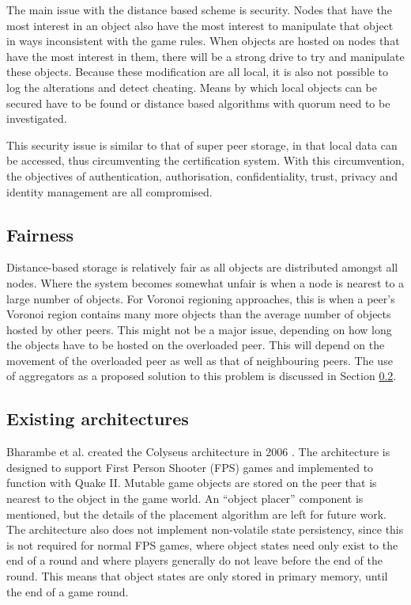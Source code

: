 The main issue with the distance based scheme is security. Nodes that have the most interest in an object also have the most interest to manipulate
that object in ways inconsistent with the game rules. When objects are hosted on nodes that have the most interest in them, there will be a strong
drive to try and manipulate these objects. Because these modification are all local, it is also not possible to log the alterations and detect
cheating. Means by which local objects can be secured have to be found or distance based algorithms with quorum need to be investigated.

This security issue is similar to that of super peer storage, in that local data can be accessed, thus circumventing the certification system. With
this circumvention, the objectives of authentication, authorisation, confidentiality, trust, privacy and identity management are all compromised.

\subsection{Fairness}

Distance-based storage is relatively fair as all objects are distributed amongst all nodes. Where the system becomes somewhat unfair is when a node
is nearest to a large number of objects. For Voronoi regioning approaches, this is when a peer's Voronoi region contains many more objects than the
average number of objects hosted by other peers. This might not be a major issue, depending on how long the objects have to be hosted on the
overloaded peer. This will depend on the movement of the overloaded peer as well as that of neighbouring peers. The use of aggregators as a proposed
solution to this problem is discussed in Section \ref{distance_based_existing_archs}.

\subsection{Existing architectures}
\label{distance_based_existing_archs}

Bharambe et al. created the Colyseus architecture in 2006 \cite{colyseus_distance_based}. The architecture is designed to support First Person
Shooter (FPS) games and implemented to function with Quake II. Mutable game objects are stored on the peer that is nearest to the object in the game
world. An ``object placer'' component is mentioned, but the details of the placement algorithm are left for future work. The architecture also does
not implement non-volatile state persistency, since this is not required for normal FPS games, where object states need only exist to the end of a
round and where players generally do not leave before the end of the round. This means that object states are only stored in primary memory, until
the end of a game round.

